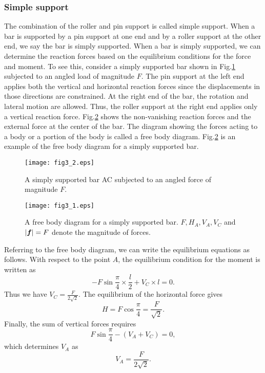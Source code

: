 ﻿\documentclass[10pt,a4j]{article}
\begin{document}
\subsubsection{Simple support}
The combination of the roller and pin support is called simple support. 
When a bar is supported by a pin support at one end and by a roller 
support at the other end, we say the bar is simply supported. 
When a bar is simply supported, we can determine the reaction forces 
based on the equilibrium conditions for the force and moment. 
To see this, consider a simply supported bar shown in Fig.\ref{fig:fig3_2}
subjected to an angled load of magnitude $F$.
The pin support at the left end applies both the vertical and horizontal reaction forces 
since the displacements in those directions are constrained.
At the right end of the bar, the rotation and lateral motion are allowed.
Thus, the roller support at the right end applies only a vertical reaction force.
Fig.\ref{fig:fig3_1} shows the non-vanishing reaction forces and the external 
force at the center of the bar. The diagram showing the forces acting to a body or 
a portion of the body is called a free body diagram. Fig.\ref{fig:fig3_1} is an example 
of the free body diagram for a simply supported bar.
\begin{figure}[h]
	\begin{center}
	\texttt{[image: fig3\_2.eps]} 
	\end{center}
	\caption{A simply supported bar AC subjected to an angled force of magnitude $F$.}
	\label{fig:fig3_2}
\end{figure}
\begin{figure}[h]
	\begin{center}
	\texttt{[image: fig3\_1.eps]} 
	\end{center}
	\caption{
		A free body diagram for a simply supported bar.
		$F, H_A, V_A, V_C$ and $|\mbox{\boldmath $f$}|=F$ denote the magnitude of forces.
	}
	\label{fig:fig3_1}
\end{figure}
Referring to the free body diagram, we can write the equilibrium equations as follows. 
With respect to the point $A$, the equilibrium condition for the moment is written as  
\[
	-F\sin\frac{\pi}{4}\times \frac{l}{2} + V_C\times l =0.
\]
Thus we have $V_C=\frac{F}{2\sqrt{2}}$. The equilibrium of the horizontal force gives
\[
	H=F\cos\frac{\pi}{4}=\frac{F}{\sqrt{2}}.
\]
Finally, the sum of vertical forces requires 
\[
	F\sin\frac{\pi}{4} -(V_A+V_C)=0, 
\]
which determines $V_A$ as 
\[
	V_A=\frac{F}{2\sqrt{2}}.
\]
\end{document}
